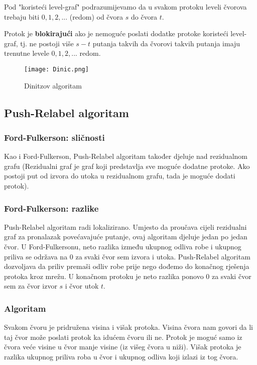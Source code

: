 \documentclass[11pt, a4paper]{article}
\begin{document}
	Pod "koristeći level-graf" podrazumijevamo da u svakom protoku leveli čvorova trebaju biti $0,1,2,...$ (redom) od čvora $s$ do čvora $t$.
	
	Protok je \textbf{blokirajući} ako je nemoguće poslati dodatke protoke koristeći level-graf, tj. ne postoji više $s-t$ putanja takvih da čvorovi takvih putanja imaju trenutne levele $0, 1, 2, ...$ redom.
	
	\newpage
	\begin{figure}[h]
		\centerline{\texttt{[image: Dinic.png]}}
		\caption{Dinitzov algoritam}
		\label{fig:dinitz}
	\end{figure}
	
	\newpage
	\subsection{Push-Relabel algoritam}
	
	\subsubsection*{Ford-Fulkerson: sličnosti}
	
	Kao i Ford-Fulkerson, Push-Relabel algoritam također djeluje nad rezidualnom grafu (Rezidualni graf je graf koji predstavlja sve moguće dodatne protoke. Ako postoji put od izvora do utoka u rezidualnom grafu, tada je moguće dodati protok).
	
	\subsubsection*{Ford-Fulkerson: razlike}
	
	Push-Relabel algoritam radi lokalizirano. Umjesto da proučava cijeli rezidualni graf za pronalazak povećavajuće putanje, ovaj algoritam djeluje jedan po jedan čvor. U Ford-Fulkersonu, neto razlika između ukupnog odliva robe i ukupnog priliva se održava na 0 za svaki čvor sem izvora i utoka. Push-Relabel algoritam dozvoljava da priliv premaši odliv robe prije nego dođemo do konačnog rješenja protoka kroz mrežu. U konačnom protoku je neto razlika ponovo 0 za svaki čvor sem za čvor izvor $s$ i čvor utok $t$.
	
	\subsubsection*{Algoritam}
	
	Svakom čvoru je pridružena visina i višak protoka. Visina čvora nam govori da li taj čvor može poslati protok ka idućem čvoru ili ne. Protok je moguć samo iz čvora veće visine u čvor manje visine (iz višeg čvora u niži). Višak protoka je razlika ukupnog priliva roba u čvor i ukupnog odliva koji izlazi iz tog čvora.
	
\end{document}
